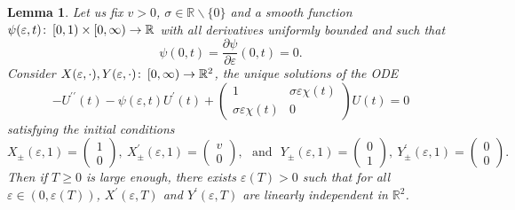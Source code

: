 \documentclass[10pt,a4paper]{amsart}
\newtheorem{lem}{Lemma}
\newcommand{\R}{\mathbb{R}}                 %
\newcommand{\col}{\colon \thinspace}        %
\begin{document}
\begin{lem}     \label{lem: Point (ii) of admissible values}
    Let us fix $v > 0$, $\sigma \in \R \backslash \{0\}$ and a smooth function $\psi(\varepsilon,t) \col [0,1) \times [0,\infty) \rightarrow \R$ with all derivatives uniformly bounded and such that 
    \begin{equation*}
        \psi(0,t) = \frac{\partial \psi}{\partial \varepsilon}(0,t) = 0 .
    \end{equation*}
    Consider $X(\varepsilon,\cdot), Y(\varepsilon,\cdot) \col [0,\infty) \rightarrow \R^2$, the unique solutions of the ODE
    \begin{equation*}
        - U^{\prime\prime}(t) - \psi(\varepsilon,t) U^\prime(t) + \begin{pmatrix} 1 & \sigma \varepsilon \chi(t) \\ \sigma \varepsilon \chi(t) & 0 \end{pmatrix} U(t) = 0
    \end{equation*}
    satisfying the initial conditions
    \begin{equation*}
        X_\pm(\varepsilon,1) = 
        \begin{pmatrix}
            1 \\
            0
        \end{pmatrix}, ~ X^\prime_\pm(\varepsilon,1) = 
        \begin{pmatrix}
            v \\
            0
        \end{pmatrix}, ~~~ \text{and} ~~~ Y_\pm(\varepsilon,1) = 
        \begin{pmatrix}
            0\\
            1
        \end{pmatrix}, ~ Y^\prime_\pm(\varepsilon,1) = 
        \begin{pmatrix}
            0\\
            0
        \end{pmatrix}.
    \end{equation*}
    Then if $T \geq 0$ is large enough, there exists $\varepsilon(T) > 0$ such that for all $\varepsilon \in (0,\varepsilon(T))$, $X^\prime(\varepsilon,T)$ and $Y^\prime(\varepsilon,T)$ are linearly independent in $\R^2$.
\end{lem}
\end{document}
